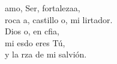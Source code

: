 \begin{cancion}%
	 amo, Ser, fortalezaa, \\
	roca a, castillo o, mi lirtador. \\
	Dios o, en cfia, \\
	mi esdo eres Tú,\\
	y la rza de mi salvión.\\
\end{cancion}%
